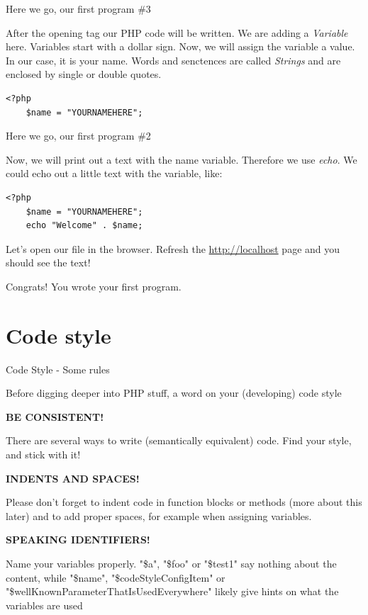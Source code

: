 \begin{frame}[fragile]{Here we go, our first program \#{}3}

After the opening tag our PHP code will be written. We are adding a \emph{Variable} here. Variables start with a dollar sign. \pause Now, we will assign the variable a value. In our case, it is your name. Words and senctences are called \emph{Strings} and are enclosed by single or double quotes.

	\begin{lstlisting}
<?php
	$name = "YOURNAMEHERE"; 

	\end{lstlisting}
\end{frame}

\begin{frame}[fragile]{Here we go, our first program \#{}2}

Now, we will print out a text with the name variable. Therefore we use \emph{echo}.
We could echo out a little text with the variable, like: \pause

	\begin{lstlisting}
<?php
	$name = "YOURNAMEHERE";
	echo "Welcome" . $name;
	\end{lstlisting}
	\pause



Let's open our file in the browser. Refresh the \url{http://localhost} page and you should see the text! \pause

Congrats! You wrote your first program.

\end{frame}


\section{Code style}
\begin{frame}[fragile]{Code Style - Some rules}

Before digging deeper into PHP stuff, a word on your (developing) code style\pause

\textbf{BE CONSISTENT!} \pause

There are several ways to write (semantically equivalent) code. Find your style, and stick with it!\pause

\textbf{INDENTS AND SPACES!} \pause

Please don't forget to indent code in function blocks or methods (more about this later) and to add proper spaces, for example when assigning variables. \pause


\textbf{SPEAKING IDENTIFIERS!} \pause

Name your variables properly. "\$a", "\$foo" or "\$test1" say nothing about the content, while "\$name", "\$codeStyleConfigItem" or "\$wellKnownParameterThatIsUsedEverywhere" likely give hints on what the variables are used\pause
\end{frame}


